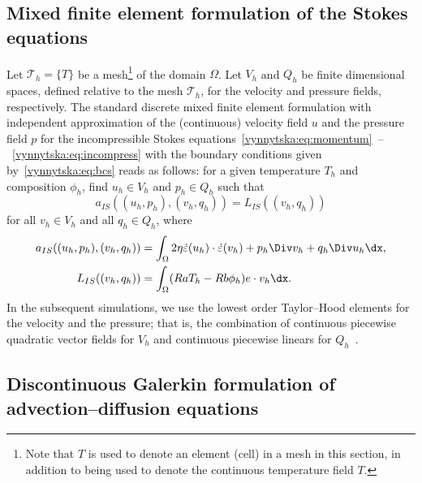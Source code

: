 \subsection{Mixed finite element formulation of the Stokes equations}

Let $\mathcal{T}_h = \{T\}$ be a mesh\footnote{Note that $T$ is used
to denote an element (cell) in a mesh in this section, in addition to
being used to denote the continuous temperature field $T$.} of the
domain $\Omega$. Let $V_h$ and $Q_h$ be finite dimensional spaces,
defined relative to the mesh $\mathcal{T}_h$, for the velocity and
pressure fields, respectively. The standard discrete mixed finite
element formulation with independent approximation of the (continuous)
velocity field $u$ and the pressure field $p$ for the incompressible
Stokes
equations~\eqref{vynnytska:eq:momentum}~--~\eqref{vynnytska:eq:incompress}
with the boundary conditions given by~\eqref{vynnytska:eq:bcs} reads
as follows: for a given temperature $T_h$ and composition $\phi_h$,
find $u_h \in V_h$ and $p_h \in Q_h$ such that
\begin{equation}
  \label{vynnytska:eq:mixed}
  a_{IS} ( (u_h, p_h), (v_h, q_h) ) = L_{IS} ( (v_h, q_h) )
\end{equation}
for all $v_h \in V_h$ and all $q_h \in Q_h$, where
\begin{align}
  a_{IS} ( (u_h, p_h), (v_h, q_h) )
  & = \int_{\Omega} 2 \eta \dot {\varepsilon}(u_h)  \cdot \dot {\varepsilon}(v_h)
  + p_h \Div v_h + q_h \Div u_h \dx,
\\
  L_{IS} ( (v_h, q_h) ) &=
  \int_{\Omega} ( Ra T_h - Rb \phi_{h} ) e \cdot v_h  \dx.
\end{align}
In the subsequent simulations, we use the lowest order Taylor--Hood
elements for the velocity and the pressure; that is, the combination
of continuous piecewise quadratic vector fields for $V_h$ and
continuous piecewise linears for $Q_h$~\citep{TaylorHood1973}.

\subsection{Discontinuous Galerkin formulation of advection--diffusion equations}

